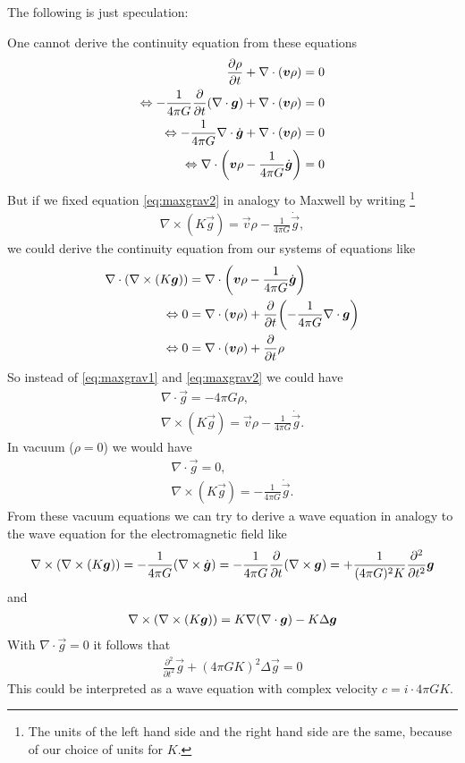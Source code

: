 The following is just speculation:

One cannot derive the continuity equation from these equations
\begin{align*}
\frac{\partial \rho}{\partial t} + \nabla \cdot { \left( \boldsymbol{v} \rho \right) } &= 0 \\
\Leftrightarrow 
-\frac{1}{4\pi G}\frac{\partial}{\partial t}{ \left( \nabla\cdot\boldsymbol{g} \right) } 
+ \nabla \cdot { \left( \boldsymbol{v} \rho \right) } &= 0 \\
\Leftrightarrow
-\frac{1}{4\pi G}\nabla\cdot\dot{\boldsymbol{g}}
+\nabla \cdot { \left( \boldsymbol{v} \rho \right) } &= 0 \\
\Leftrightarrow 
\nabla \cdot { \left( \boldsymbol{v} \rho - \frac{1}{4\pi G} \dot{\boldsymbol{g}} \right) } &= 0
\end{align*}
But if we fixed equation \eqref{eq:maxgrav2} in analogy to Maxwell by writing
\footnote{The units of the left hand side and the right hand side are the
same, because of our choice of units for $K$.}
\begin{align}
\nabla \times (K \vec{g}) = \vec{v} \rho - \frac{1}{4\pi G} \dot{\vec{g}},
\end{align}
we could derive the continuity equation from our systems of equations like
\begin{align*}
\nabla \cdot { \left( \nabla \times (K \boldsymbol{g}) \right) } &= \nabla \cdot { \left( \boldsymbol{v} \rho 
- \frac{1}{4\pi G} \dot{\boldsymbol{g}} \right) }\\
\Leftrightarrow 
0 &= \nabla \cdot { \left( \boldsymbol{v} \rho \right) } 
+ \frac{\partial}{\partial t}{ \left( -\frac{1}{4\pi G} \nabla \cdot \boldsymbol{g} \right) } \\
\Leftrightarrow
0 &= \nabla \cdot { \left( \boldsymbol{v} \rho \right) } + \frac{\partial}{\partial t} \rho
\end{align*}
So instead of \eqref{eq:maxgrav1} and \eqref{eq:maxgrav2} we could have
\begin{align}
\nabla \cdot \vec{g} = - 4\pi G\rho, \\
\nabla \times (K\vec{g}) = \vec{v} \rho - \frac{1}{4\pi G} \dot{\vec{g}}.
\end{align}
In vacuum ($\rho=0$) we would have 
\begin{align}
\nabla \cdot \vec{g} = 0, \\
\nabla \times (K\vec{g}) = - \frac{1}{4\pi G} \dot{\vec{g}}.
\end{align}
From these vacuum equations we can try to derive a wave equation in analogy 
to the wave equation for the electromagnetic field like
\begin{align}
\nabla \times { \left( \nabla \times (K\boldsymbol{g}) \right) } = 
- \frac{1}{4\pi G} { \left( \nabla \times \dot{\boldsymbol{g}} \right) }= 
- \frac{1}{4\pi G} \frac{\partial}{\partial t} { \left( \nabla \times \boldsymbol{g} \right) }=
+ \frac{1}{(4\pi G)^2 K} \frac{\partial^2}{\partial t^2} \boldsymbol{g}
\end{align}
and
\begin{align}
\nabla \times { \left( \nabla \times (K \boldsymbol{g}) \right) } = 
K \nabla { \left( \nabla \cdot \boldsymbol{g} \right) } - K \Delta \boldsymbol{g}
\end{align}
With $\nabla \cdot \vec{g} = 0$ it follows that
\begin{align}
\frac{\partial^2}{\partial t^2} \vec{g}+(4\pi G K)^2 \Delta \vec{g} = 0
\end{align}
This could be interpreted as a wave equation with complex velocity
$c=i \cdot 4\pi G K$.

